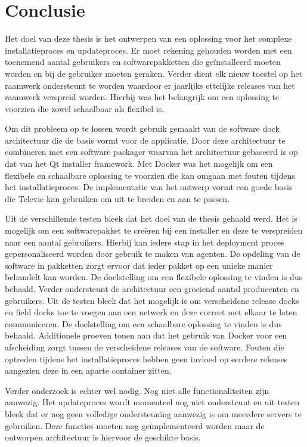 \chapter{Conclusie}
Het doel van deze thesis is het ontwerpen van een oplossing voor het complexe installatieproces en updateproces.
Er moet rekening gehouden worden met een toenemend aantal gebruikers en softwarepakketten die geïnstalleerd moeten worden en bij de gebruiker moeten geraken.
Verder dient elk nieuw toestel op het raamwerk ondersteunt te worden waardoor er jaarlijks ettelijke releases van het raamwerk verspreid worden.
Hierbij was het belangrijk om een oplossing te voorzien die zowel schaalbaar als flexibel is.

Om dit probleem op te lossen wordt gebruik gemaakt van de software dock architectuur die de basis vormt voor de applicatie.
Door deze architectuur te combineren met een software packager waarvan het architectuur gebaseerd is op dat van het Qt installer framework.
Met Docker was het mogelijk om een flexibele en schaalbare oplossing te voorzien die kan omgaan met fouten tijdens het installatieproces.
De implementatie van het ontwerp vormt een goede basis die Televic kan gebruiken om uit te breiden en aan te passen.

Uit de verschillende testen bleek dat het doel van de thesis gehaald werd.
Het is mogelijk om een softwarepakket te creëren bij een installer en deze te verspreiden naar een aantal gebruikers.
Hierbij kan iedere stap in het deployment proces gepersonaliseerd worden door gebruik te maken van agenten.
De opdeling van de software in pakketten zorgt ervoor dat ieder pakket op een unieke manier behandelt kan worden.
De doelstelling om een flexibele oplossing te vinden is dus behaald.
Verder ondersteunt de architectuur een groeiend aantal producenten en gebruikers.
Uit de testen bleek dat het mogelijk is om verscheidene release docks en field docks toe te voegen aan een netwerk en deze correct met elkaar te laten communiceren.
De doelstelling om een schaalbare oplossing te vinden is dus behaald.
Additionele proeven tonen aan dat het gebruik van Docker voor een afscheiding zorgt tussen de verscheidene releases van de software.
Fouten die optreden tijdens het installatieproces hebben geen invloed op eerdere releases aangezien deze in een aparte container zitten.

Verder onderzoek is echter wel nodig.
Nog niet alle functionaliteiten zijn aanwezig.
Het updateproces wordt momenteel nog niet ondersteunt en uit testen bleek dat er nog geen volledige ondersteuning aanwezig is om meerdere servers te gebruiken.
Deze functies moeten nog geïmplementeerd worden maar de ontworpen architectuur is hiervoor de geschikte basis.